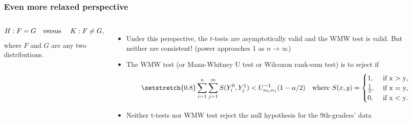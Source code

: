 \begin{frame}\frametitle{Even more relaxed perspective}
	\begin{columns}
		\begin{per}
	\begin{equation*}\vspace{-0.5em}
	H:F=G \text{\quad versus \quad} K:F \neq G,
\end{equation*}
where $F$ and $G$ are any two distributions.
		\end{per}
\begin{itemize}
	\item Under this perspective, the $t$-tests are \alert{asymptotically valid} and the WMW test is \alert{valid}. But neither are \alert{consistent}! {\scriptsize (power approaches 1 as $n\rightarrow \infty$)}
	\item The WMW test {\scriptsize (or Mann-Whitney U test or Wilcoxon rank-sum test)} is to reject if \vspace{-1em}
\begin{equation*}\vspace{-0.5em}\setstretch{0.8}
		\sum_{i=1}^n \sum_{j=1}^m S(Y^0_i, Y^1_j) < U_{n_0,n_1}^{-1}(1-\alpha/2)
		\text{\quad where }
		S(x, y)=
		\begin{cases}
			1, & \text{ if } $x > y$,\\
			\frac{1}{2}, & \text{ if } $x = y$,\\
			0, & \text{ if } $x < y$.
		\end{cases}
\end{equation*}
\item Neither t-tests nor WMW test reject the null hypothesis for the 9th-graders' data
\end{itemize}
	\end{columns}
\end{frame}


